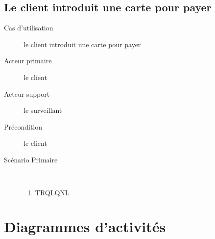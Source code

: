 \documentclass[a4paper]{article}
\begin{document}
\subsection{Le client introduit une carte pour payer}
\begin{description}
	\item[Cas d'utilisation] le client introduit une carte pour payer
	\item[Acteur primaire] le client
	\item[Acteur support] le surveillant
	\item[Pr\'econdition] le client 
	\item[Sc\'enario Primaire] \
	\begin{enumerate}
		\item TRQLQNL
	\end{enumerate}
\end{description}
\section{Diagrammes d'activit\'es}
\end{document}
